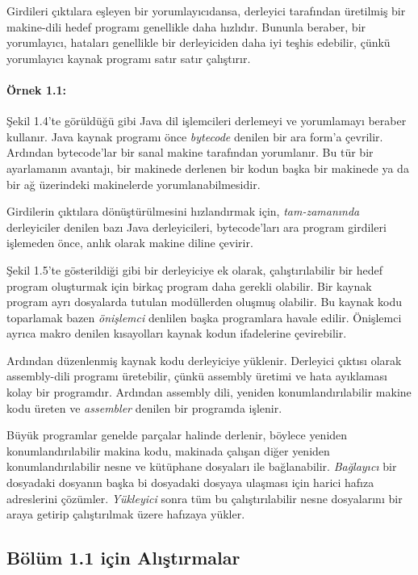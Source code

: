 \documentclass{book}
\begin{document}
Girdileri çıktılara eşleyen bir yorumlayıcıdansa, derleyici tarafından üretilmiş bir makine-dili hedef programı genellikle daha hızlıdır. Bununla beraber, bir yorumlayıcı, hataları genellikle bir derleyiciden daha iyi teşhis edebilir, çünkü yorumlayıcı kaynak programı satır satır çalıştırır.

\paragraph{Örnek 1.1:}
Şekil 1.4'te görüldüğü gibi Java dil işlemcileri derlemeyi ve yorumlamayı beraber kullanır. Java kaynak programı önce \textit{bytecode} denilen bir ara form'a çevrilir. Ardından bytecode'lar bir sanal makine tarafından yorumlanır. Bu tür bir ayarlamanın avantajı, bir makinede derlenen bir kodun başka bir makinede ya da bir ağ üzerindeki makinelerde yorumlanabilmesidir.

Girdilerin çıktılara dönüştürülmesini hızlandırmak için, \textit{tam-zamanında} derleyiciler denilen bazı Java derleyicileri, bytecode'ları ara program girdileri işlemeden önce,  anlık olarak makine diline çevirir. 



Şekil 1.5'te gösterildiği gibi bir derleyiciye ek olarak, çalıştırılabilir bir hedef program oluşturmak için birkaç program daha gerekli olabilir. Bir kaynak program ayrı dosyalarda tutulan modüllerden oluşmuş olabilir. Bu kaynak kodu toparlamak bazen \textit{önişlemci} denlilen başka programlara havale edilir. Önişlemci ayrıca makro denilen kısayolları kaynak kodun ifadelerine çevirebilir.

Ardından düzenlenmiş kaynak kodu derleyiciye yüklenir. Derleyici çıktısı olarak assembly-dili programı üretebilir, çünkü assembly üretimi ve hata ayıklaması kolay bir programdır. Ardından assembly dili, yeniden konumlandırılabilir makine kodu üreten ve \textit{assembler} denilen bir programda işlenir.

Büyük programlar genelde parçalar halinde derlenir, böylece yeniden konumlandırılabilir makina kodu, makinada çalışan diğer yeniden konumlandırılabilir nesne ve kütüphane dosyaları ile bağlanabilir. \textit{Bağlayıcı} bir dosyadaki dosyanın başka bi dosyadaki dosyaya ulaşması için harici hafıza adreslerini çözümler. \textit{Yükleyici} sonra tüm bu çalıştırılabilir nesne dosyalarını bir araya getirip çalıştırılmak üzere hafızaya yükler.  

\subsection{Bölüm 1.1 için Alıştırmalar}
\end{document}

